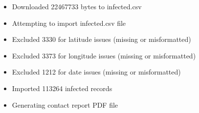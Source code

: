 \documentclass{article}
\begin{document}
\begin{itemize}
\begin{itemize}
			\item	{Downloaded 22467733 bytes to infected.csv}
			\item	{Attempting to import infected.csv file}
			\item	{Excluded 3330 for latitude issues (missing or misformatted)}
			\item	{Excluded 3373 for longitude issues (missing or misformatted)}
			\item	{Excluded 1212 for date issues (missing or misformatted)}
			\item	{Imported 113264 infected records}
			\item	{Generating contact report PDF file}
		\end{itemize}
\end{itemize}
\end{document}

